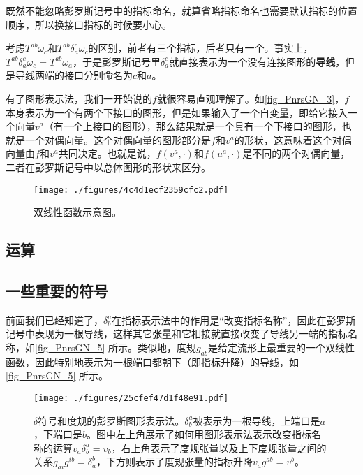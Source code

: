 既然不能忽略彭罗斯记号中的指标命名，就算省略指标命名也需要默认指标的位置顺序，所以换接口指标的时候要小心。

考虑$T^{ab}\omega_{c}$和$T^{ab}\delta^c_a\omega_{c}$的区别，前者有三个指标，后者只有一个。事实上，$T^{ab}\delta^c_a\omega_{c} = T^{ab}\omega_{a}$，于是彭罗斯记号里$\delta^c_a$就直接表示为一个没有连接图形的\textbf{导线}，但是导线两端的接口分别命名为$c$和$a$。


有了图形表示法，我们一开始说的$f$就很容易直观理解了。如\autoref{fig_PnrsGN_3}，$f$本身表示为一个有两个下接口的图形，但是如果输入了一个自变量，即给它接入一个向量$v^a$（有一个上接口的图形），那么结果就是一个具有一个下接口的图形，也就是一个对偶向量。这个对偶向量的图形部分是$f$和$v^a$的形状，这意味着这个对偶向量由$f$和$v^a$共同决定。也就是说，$f(v^a, \cdot)$和$f(u^a, \cdot)$是不同的两个对偶向量，二者在彭罗斯记号中以总体图形的形状来区分。

\begin{figure}[ht]
\centering
\texttt{[image: ./figures/4c4d1ecf2359cfc2.pdf]}
\caption{双线性函数示意图。} \label{fig_PnrsGN_3}
\end{figure}



\subsection{运算}











\subsection{一些重要的符号}


前面我们已经知道了，$\delta_b^a$在指标表示法中的作用是“改变指标名称”，因此在彭罗斯记号中表现为一根导线，这样其它张量和它相接就直接改变了导线另一端的指标名称，如\autoref{fig_PnrsGN_5} 所示。类似地，度规$g_{ab}$是给定流形上最重要的一个双线性函数，因此特别地表示为一根端口都朝下（即指标升降）的导线，如\autoref{fig_PnrsGN_5} 所示。






\begin{figure}[ht]
\centering
\texttt{[image: ./figures/25cfef47d1f48e91.pdf]}
\caption{$\delta$符号和度规的彭罗斯图形表示法。$\delta^a_b$被表示为一根导线，上端口是$a$，下端口是$b$。图中左上角展示了如何用图形表示法表示改变指标名称的运算$v_a\delta^a_b=v_b$，右上角表示了度规张量以及上下度规张量之间的关系$g_{ai}g^{ib}=\delta^b_a$，下方则表示了度规张量的指标升降$v_ag^{ab}=v^b$。} \label{fig_PnrsGN_5}
\end{figure}


















